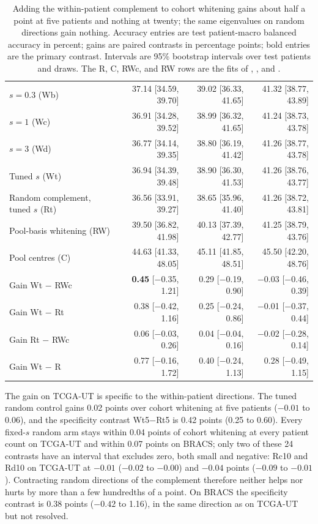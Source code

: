 \begin{table}[htbp]
\begin{tabular}{@{}lrrr@{}}
$s=0.3$ (Wb) & 37.14 [34.59, 39.70] & 39.02 [36.33, 41.65] & 41.32 [38.77, 43.89] \\
$s=1$ (Wc) & 36.91 [34.28, 39.52] & 38.99 [36.32, 41.65] & 41.24 [38.73, 43.78] \\
$s=3$ (Wd) & 36.77 [34.14, 39.35] & 38.80 [36.19, 41.42] & 41.26 [38.77, 43.78] \\
Tuned $s$ (Wt) & 36.94 [34.39, 39.48] & 38.90 [36.30, 41.53] & 41.26 [38.76, 43.77] \\
Random complement, tuned $s$ (Rt) & 36.56 [33.91, 39.27] & 38.65 [35.96, 41.40] & 41.26 [38.72, 43.81] \\
Pool-basis whitening (RW) & 39.50 [36.82, 41.98] & 40.13 [37.39, 42.77] & 41.25 [38.79, 43.76] \\
Pool centres (C) & 44.63 [41.33, 48.05] & 45.11 [41.85, 48.51] & 45.50 [42.20, 48.76] \\
\addlinespace
Gain Wt $-$ RWc & \textbf{0.45} [$-$0.35, 1.21] & 0.29 [$-$0.19, 0.90] & $-$0.03 [$-$0.46, 0.39] \\
Gain Wt $-$ Rt & 0.38 [$-$0.42, 1.16] & 0.25 [$-$0.24, 0.86] & $-$0.01 [$-$0.37, 0.44] \\
Gain Rt $-$ RWc & 0.06 [$-$0.03, 0.26] & 0.04 [$-$0.04, 0.16] & $-$0.02 [$-$0.28, 0.14] \\
Gain Wt $-$ R & 0.77 [$-$0.16, 1.72] & 0.40 [$-$0.24, 1.13] & 0.28 [$-$0.49, 1.15] \\
\bottomrule
\end{tabular}
\caption{Adding the within-patient complement to cohort whitening gains about half a point at five patients and nothing at twenty; the same eigenvalues on random directions gain nothing. Accuracy entries are test patient-macro balanced accuracy in percent; gains are paired contrasts in percentage points; bold entries are the primary contrast. Intervals are 95\% bootstrap intervals over test patients and draws. The R, C, RWc, and RW rows are the fits of \citet{queisler2026centreError}, \citet{queisler2026patientDirections}, and \citet{queisler2026bracsMechanism}.}
\label{tab:accuracy}
\end{table}

\noindent The gain on TCGA-UT is specific to the within-patient directions. The tuned random control gains 0.02 points over cohort whitening at five patients ($-0.01$ to 0.06), and the specificity contrast Wt5$-$Rt5 is 0.42 points (0.25 to 0.60). Every fixed-$s$ random arm stays within 0.04 points of cohort whitening at every patient count on TCGA-UT and within 0.07 points on BRACS; only two of these 24 contrasts have an interval that excludes zero, both small and negative: Rc10 and Rd10 on TCGA-UT at $-0.01$ ($-0.02$ to $-0.00$) and $-0.04$ points ($-0.09$ to $-0.01$). Contracting random directions of the complement therefore neither helps nor hurts by more than a few hundredths of a point. On BRACS the specificity contrast is 0.38 points ($-0.42$ to 1.16), in the same direction as on TCGA-UT but not resolved.

